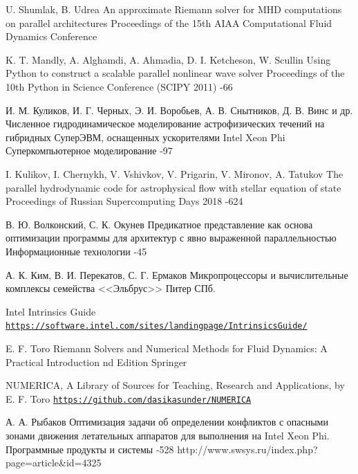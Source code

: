 \documentclass[utf8]{psta}
\begin{document}
\begin{thebibliography}{30}
\by U. Shumlak, B. Udrea
\paper An approximate Riemann solver for MHD computations on parallel architectures
\jour Proceedings of the 15th AIAA Computational Fluid Dynamics Conference

\by K. T. Mandly, A. Alghamdi, A. Ahmadia, D. I. Ketcheson, W. Scullin
\paper Using Python to construct a scalable parallel nonlinear wave solver
\jour Proceedings of the 10th Python in Science Conference (SCIPY 2011)
-66

\by И. М. Куликов, И. Г. Черных, Э. И. Воробьев, А. В. Снытников, Д. В. Винс и др.
\paper Численное гидродинамическое моделирование астрофизических течений на гибридных СуперЭВМ, оснащенных ускорителями Intel Xeon Phi
\jour Суперкомпьютерное моделирование
-97

\by I. Kulikov, I. Chernykh, V. Vshivkov, V. Prigarin, V. Mironov, A. Tatukov
\paper The parallel hydrodynamic code for astrophysical flow with stellar equation of state
\jour Proceedings of Russian Supercomputing Days 2018
-624

\by В. Ю. Волконский, С. К. Окунев
\paper Предикатное представление как основа оптимизации программы для архитектур с явно выраженной параллельностью
\jour Информационные технологии
-45

\by А. К. Ким, В. И. Перекатов, С. Г. Ермаков
\book Микропроцессоры и вычислительные комплексы семейства <<Эльбрус>>
\publ Питер
\publaddr СПб.

\finalinfo Intel Intrinsics Guide\\
\href{https://software.intel.com/sites/landingpage/IntrinsicsGuide/}{{\tt https://software.intel.com/sites/landingpage/IntrinsicsGuide/}}

\by E. F. Toro
\book Riemann Solvers and Numerical Methods for Fluid Dynamics: A Practical Introduction
 nd Edition
\publ Springer

\finalinfo NUMERICA, A Library of Sources for Teaching, Research and Applications, by E. F. Toro
\href{https://github.com/dasikasunder/NUMERICA}{{\tt https://github.com/dasikasunder/NUMERICA}}

\by А. А. Рыбаков
\paper Оптимизация задачи об определении конфликтов с опасными зонами движения летательных аппаратов для выполнения на Intel Xeon Phi.
\jour Программные продукты и системы
-528
\URL http://www.swsys.ru/index.php?page=article&id=4325


\end{thebibliography}
\end{document}
